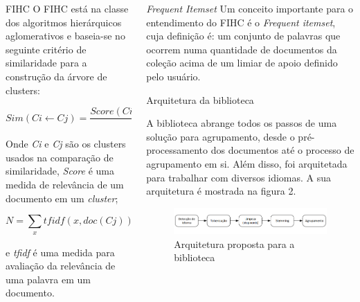 \documentclass[final]{beamer}
\newlength{\onecolwid}
\newlength{\twocolwid}
\begin{document}
\begin{frame}[t]
\begin{columns}[t]
\begin{column}{\twocolwid}
\begin{columns}[t,totalwidth=\twocolwid]
\begin{column}{\onecolwid}
\begin{block}{FIHC}
O FIHC está na classe dos algoritmos hierárquicos aglomerativos e baseia-se no seguinte critério de similaridade para a construção da árvore de clusters:

\begin{equation}
Sim(Ci \gets Cj) = \frac{Score(Ci \gets doc(Cj))}{N} + 1
\label{eqn:Sim}
\end{equation}

Onde \textit{Ci} e \textit{Cj} são os clusters usados na comparação de similaridade, \textit{Score} é uma medida de relevância de um documento em um \textit{cluster};

\begin{equation}
N = \sum_{x}tfidf(x, doc(Cj)) + \sum_{x'}tfidf(x', doc(Cj))
\label{eqn:Sim_N}
\end{equation}

e \textit{tfidf} é uma medida para avaliação da relevância de uma palavra em um documento.

\end{block}


\end{column} %

\begin{column}{\onecolwid}\vspace{-.6in} %


\begin{block}{\textit{Frequent Itemset}}
Um conceito importante para o entendimento do FIHC é o \textit{Frequent itemset}, cuja definição é: um conjunto de palavras que ocorrem numa quantidade de documentos da coleção acima de um limiar de apoio definido pelo usuário.
\end{block}

\begin{block}{Arquitetura da biblioteca}

A biblioteca abrange todos os passos de uma solução para agrupamento, desde o pré-processamento dos documentos até o processo de agrupamento em si. Além disso, foi arquitetada para trabalhar com diversos idiomas. A sua arquitetura é mostrada na figura 2.

\begin{figure}
\includegraphics[width=0.95\linewidth]{arquitetura.png}
\caption{Arquitetura proposta para a biblioteca}
\end{figure}


\end{block}
\end{column}
\end{columns}
\end{column}
\end{columns}
\end{frame}
\end{document}
